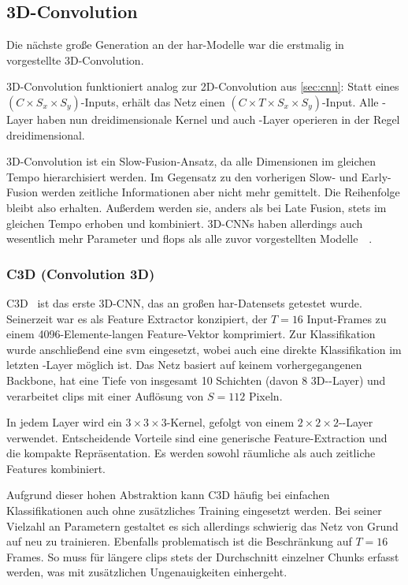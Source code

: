 \subsection{3D-Convolution}
\label{subsec:3d-conv}

Die nächste große Generation an der \gls{har}-Modelle war die erstmalig in~\cite{Ji13} vorgestellte 3D-Convolution.

3D-Convolution funktioniert analog zur 2D-Convolution aus \autoref{sec:cnn}:
Statt eines $(C \times S_x \times S_y)$-Inputs, erhält das Netz einen $(C \times T \times S_x \times S_y)$-Input.
Alle \conv-Layer haben nun dreidimensionale Kernel und auch \pool-Layer operieren in der Regel dreidimensional.

3D-Convolution ist ein Slow-Fusion-Ansatz, da alle Dimensionen im gleichen Tempo hierarchisiert werden.
Im Gegensatz zu den vorherigen Slow- und Early-Fusion werden zeitliche Informationen aber nicht mehr gemittelt.
Die Reihenfolge bleibt also erhalten.
Außerdem werden sie, anders als bei Late Fusion, stets im gleichen Tempo erhoben und kombiniert.
3D-CNNs haben allerdings auch wesentlich mehr Parameter und \gls{flops} als alle zuvor vorgestellten Modelle~\cite{Zhu19}~\cite{Carreira17}.

\subsubsection*{C3D (Convolution 3D)}

C3D~\cite{Tran15} ist das erste 3D-CNN, das an großen \gls{har}-Datensets getestet wurde.
Seinerzeit war es als Feature Extractor konzipiert, der $T=16$ Input-Frames zu einem 4096-Elemente-langen Feature-Vektor komprimiert.
Zur Klassifikation wurde anschließend eine \gls{svm} eingesetzt, wobei auch eine direkte Klassifikation im letzten \fc-Layer möglich ist.
Das Netz basiert auf keinem vorhergegangenen Backbone, hat eine Tiefe von insgesamt 10 Schichten (davon 8 3D-\conv-Layer) und verarbeitet \glspl{clip} mit einer Auflösung von $S=112$ Pixeln.

In jedem Layer wird ein $3 \times 3 \times 3$-Kernel, gefolgt von einem $2 \times 2 \times 2$-\pool-Layer verwendet.
Entscheidende Vorteile sind eine generische Feature-Extraction und die kompakte Repräsentation.
Es werden sowohl räumliche als auch zeitliche Features kombiniert.

Aufgrund dieser hohen Abstraktion kann C3D häufig bei einfachen Klassifikationen auch ohne zusätzliches Training eingesetzt werden.
Bei seiner Vielzahl an Parametern gestaltet es sich allerdings schwierig das Netz von Grund auf neu zu trainieren.
Ebenfalls problematisch ist die Beschränkung auf $T=16$ Frames.
So muss für längere \glspl{clip} stets der Durchschnitt einzelner Chunks erfasst werden, was mit zusätzlichen Ungenauigkeiten einhergeht.

